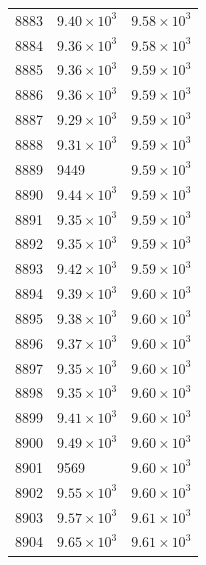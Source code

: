 \begin{table}[H]
\begin{tabular}{lll}
8883 & $\displaystyle 9.40 \times 10^{3}$ & $\displaystyle 9.58 \times 10^{3}$ \\
8884 & $\displaystyle 9.36 \times 10^{3}$ & $\displaystyle 9.58 \times 10^{3}$ \\
8885 & $\displaystyle 9.36 \times 10^{3}$ & $\displaystyle 9.59 \times 10^{3}$ \\
8886 & $\displaystyle 9.36 \times 10^{3}$ & $\displaystyle 9.59 \times 10^{3}$ \\
8887 & $\displaystyle 9.29 \times 10^{3}$ & $\displaystyle 9.59 \times 10^{3}$ \\
8888 & $\displaystyle 9.31 \times 10^{3}$ & $\displaystyle 9.59 \times 10^{3}$ \\
8889 & 9449 & $\displaystyle 9.59 \times 10^{3}$ \\
8890 & $\displaystyle 9.44 \times 10^{3}$ & $\displaystyle 9.59 \times 10^{3}$ \\
8891 & $\displaystyle 9.35 \times 10^{3}$ & $\displaystyle 9.59 \times 10^{3}$ \\
8892 & $\displaystyle 9.35 \times 10^{3}$ & $\displaystyle 9.59 \times 10^{3}$ \\
8893 & $\displaystyle 9.42 \times 10^{3}$ & $\displaystyle 9.59 \times 10^{3}$ \\
8894 & $\displaystyle 9.39 \times 10^{3}$ & $\displaystyle 9.60 \times 10^{3}$ \\
8895 & $\displaystyle 9.38 \times 10^{3}$ & $\displaystyle 9.60 \times 10^{3}$ \\
8896 & $\displaystyle 9.37 \times 10^{3}$ & $\displaystyle 9.60 \times 10^{3}$ \\
8897 & $\displaystyle 9.35 \times 10^{3}$ & $\displaystyle 9.60 \times 10^{3}$ \\
8898 & $\displaystyle 9.35 \times 10^{3}$ & $\displaystyle 9.60 \times 10^{3}$ \\
8899 & $\displaystyle 9.41 \times 10^{3}$ & $\displaystyle 9.60 \times 10^{3}$ \\
8900 & $\displaystyle 9.49 \times 10^{3}$ & $\displaystyle 9.60 \times 10^{3}$ \\
8901 & 9569 & $\displaystyle 9.60 \times 10^{3}$ \\
8902 & $\displaystyle 9.55 \times 10^{3}$ & $\displaystyle 9.60 \times 10^{3}$ \\
8903 & $\displaystyle 9.57 \times 10^{3}$ & $\displaystyle 9.61 \times 10^{3}$ \\
8904 & $\displaystyle 9.65 \times 10^{3}$ & $\displaystyle 9.61 \times 10^{3}$ \\

\end{tabular}
\end{table}
